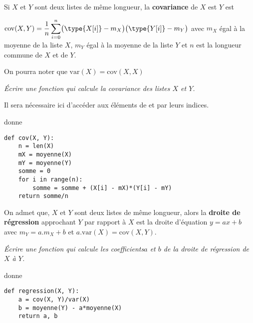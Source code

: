 Si $X$ et $Y$ sont deux listes de même longueur, la {\bf covariance} de $X$ est $Y$ est 

$\displaystyle \text{cov}(X, Y) =  \frac 1n \sum_{i=0}^n \bigl(\type{X[i]} -m_X\bigr)\bigl(\type{Y[i]} -m_Y\bigr)$ avec $m_X$ égal à la moyenne de la liste $X$, $m_Y$ égal à la moyenne de la liste $Y$ et $n$ est la longueur commune de $X$ et de $Y$.

On pourra noter que $\text{var}(X) = \text{cov}(X, X)$
\begin{Exercise}[title = Covariance]
\it Écrire une fonction  qui calcule la covariance des listes $X$ et $Y$.

Il sera nécessaire ici d'accéder aux éléments de  et  par leurs indices.

 donne 
\end{Exercise}
\begin{Answer}
\begin{lstlisting}
def cov(X, Y):
    n = len(X)
    mX = moyenne(X)
    mY = moyenne(Y)
    somme = 0
    for i in range(n):
        somme = somme + (X[i] - mX)*(Y[i] - mY)
    return somme/n
\end{lstlisting}
\end{Answer}
\bigskip


On admet que, $X$ et $Y$ sont deux listes de même longueur, alors la {\bf droite de régression} approchant $Y$ par rapport à $X$ est la droite d'équation $y = ax+b$ avec $m_Y = a.m_X + b$ et $a.\text{var}(X)=\text{cov}(X, Y)$.
\begin{Exercise}[title = Droite de régression]
\it Écrire une fonction  qui calcule les coefficients$a$ et $b$ de la droite de régression de $X$ à $Y$.

 donne 
\end{Exercise}
\begin{Answer}
\begin{lstlisting}
def regression(X, Y):
    a = cov(X, Y)/var(X)
    b = moyenne(Y) - a*moyenne(X)
    return a, b
\end{lstlisting}
\end{Answer}
